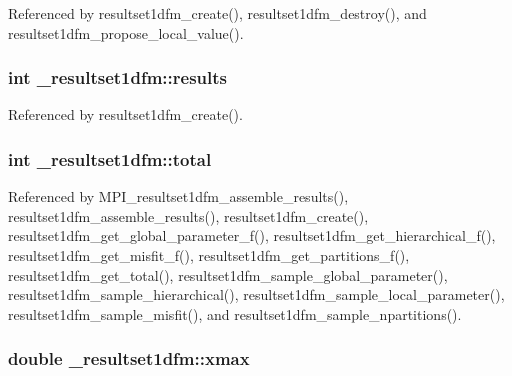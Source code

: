 Referenced by resultset1dfm\+\_\+create(), resultset1dfm\+\_\+destroy(), and resultset1dfm\+\_\+propose\+\_\+local\+\_\+value().

\subsubsection[{\texorpdfstring{results}{results}}]{\setlength{\rightskip}{0pt plus 5cm}int \+\_\+resultset1dfm\+::results}\hypertarget{struct__resultset1dfm_a85df836eee4586560d60c48f1b0db18d}{}\label{struct__resultset1dfm_a85df836eee4586560d60c48f1b0db18d}


Referenced by resultset1dfm\+\_\+create().

\subsubsection[{\texorpdfstring{total}{total}}]{\setlength{\rightskip}{0pt plus 5cm}int \+\_\+resultset1dfm\+::total}\hypertarget{struct__resultset1dfm_a5d28e0bc99107bfa56c1a2c9a3d396ee}{}\label{struct__resultset1dfm_a5d28e0bc99107bfa56c1a2c9a3d396ee}


Referenced by M\+P\+I\+\_\+resultset1dfm\+\_\+assemble\+\_\+results(), resultset1dfm\+\_\+assemble\+\_\+results(), resultset1dfm\+\_\+create(), resultset1dfm\+\_\+get\+\_\+global\+\_\+parameter\+\_\+f(), resultset1dfm\+\_\+get\+\_\+hierarchical\+\_\+f(), resultset1dfm\+\_\+get\+\_\+misfit\+\_\+f(), resultset1dfm\+\_\+get\+\_\+partitions\+\_\+f(), resultset1dfm\+\_\+get\+\_\+total(), resultset1dfm\+\_\+sample\+\_\+global\+\_\+parameter(), resultset1dfm\+\_\+sample\+\_\+hierarchical(), resultset1dfm\+\_\+sample\+\_\+local\+\_\+parameter(), resultset1dfm\+\_\+sample\+\_\+misfit(), and resultset1dfm\+\_\+sample\+\_\+npartitions().

\subsubsection[{\texorpdfstring{xmax}{xmax}}]{\setlength{\rightskip}{0pt plus 5cm}double \+\_\+resultset1dfm\+::xmax}\hypertarget{struct__resultset1dfm_ade4d1f92f73dffdbe895a37491976102}{}\label{struct__resultset1dfm_ade4d1f92f73dffdbe895a37491976102}


